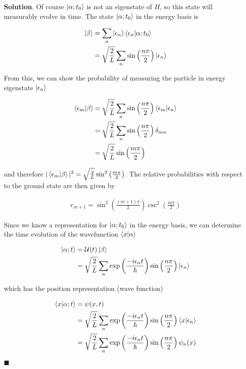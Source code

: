 \documentclass[12pt]{article}
\theoremstyle{definition}
\newenvironment{s}{%
        \begin{trivlist} \item \textbf{Solution}. }{%
            \hspace*{\fill} $\blacksquare$\end{trivlist}}%
\begin{document}
{\begin{s}
Of course $\ket{\alpha; t_{0}}$ is not an eigenstate of $H$, so this state will measurably evolve in time. The state $\ket{\alpha; t_{0}}$ in the energy basis is

\begin{align*}
\ket{\beta} &= \sum_{n}\ket{\epsilon_{n}}\bra{\epsilon_{n}}\ket{\alpha;t_{0}}\\
&=  \sqrt{\frac{2}{L}}\sum_{n}\sin\left(\frac{n\pi}{2}\right)\ket{\epsilon_{n}}
\end{align*}

From this, we can show the probability of measuring the particle in energy eigenstate $\ket{\epsilon_{n}}$

\begin{align*}
\bra{\epsilon_{m}}\ket{\beta} &= \sqrt{\frac{2}{L}}\sum_{n}\sin\left(\frac{n\pi}{2}\right)\bra{\epsilon_{m}}\ket{\epsilon_{n}}\\
&= \sqrt{\frac{2}{L}}\sum_{n}\sin\left(\frac{n\pi}{2}\right)\delta_{mn}\\
&= \sqrt{\frac{2}{L}}\sin\left(\frac{m\pi}{2}\right)\\
\end{align*}

and therefore $|\bra{\epsilon_{m}}\ket{\beta}|^{2} = \sqrt{\frac{2}{L}}\sin^{2}\left(\frac{m\pi}{2}\right)$. The relative probabilities with respect to the ground state are then given by

\begin{align*}
r_{m+1} = \sin^{2}\left(\frac{(m+1)\pi}{2}\right)\csc^{2}\left(\frac{m\pi}{2}\right)
\end{align*}


Since we know a representation for $\ket{\alpha;t_{0}}$ in the energy basis, we can determine the time evolution of the wavefunction $\bra{x}\ket{\alpha}$

\begin{align*}
\ket{\alpha;t} &= \mathcal{U}(t)\ket{\beta} \\
&= \sqrt{\frac{2}{L}}\sum_{n}\exp\left(\frac{-i\epsilon_{n}t}{\hbar}\right)\sin\left(\frac{n\pi}{2}\right)\ket{\epsilon_{n}}
\end{align*}

which has the position representation (wave function)

\begin{align*}
\bra{x}\ket{\alpha; t} &= \psi(x,t)\\
&= \sqrt{\frac{2}{L}}\sum_{n}\exp\left(\frac{-i\epsilon_{n}t}{\hbar}\right)\sin\left(\frac{n\pi}{2}\right)\bra{x}\ket{\epsilon_{n}}\\
&= \sqrt{\frac{2}{L}}\sum_{n}\exp\left(\frac{-i\epsilon_{n}t}{\hbar}\right)\sin\left(\frac{n\pi}{2}\right)\psi_{n}(x)
\end{align*}


\end{s}}
\end{document}

